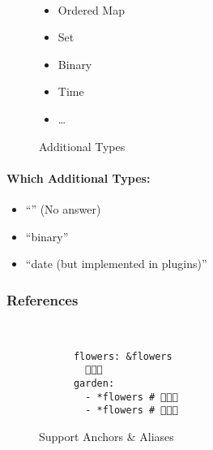 \begin{figure}[H]
  \begin{minipage}[t]{0.48\textwidth}
    \vspace{0pt}
    \begin{bchart}[max=9, width=0.85\textwidth]
    \end{bchart}
  \end{minipage}
  \begin{minipage}[t]{0pt}~\end{minipage}
  \begin{minipage}[t]{0.48\textwidth}
    \vspace{0pt}
    \begin{itemize}
      \item Ordered Map
      \item Set
      \item Binary
      \item Time
      \item …
    \end{itemize}
  \end{minipage}
  \caption{Additional Types}
\end{figure}

\paragraph{Which Additional Types:}
\begin{itemize}
  \item “” (No answer)
  \item “binary”
  \item “date (but implemented in plugins)”
\end{itemize}

\subsubsection{References}

\begin{figure}[H]
  \begin{minipage}[t]{0.48\textwidth}
    \vspace{0pt}
    \begin{bchart}[max=9, width=0.85\textwidth]
    \end{bchart}
  \end{minipage}
  \begin{minipage}[t]{0pt}~\end{minipage}
  \begin{minipage}[t]{0.48\textwidth}
    \vspace{0pt}
    \begin{verbatim}
      flowers: &flowers
        🌳🌸🌼
      garden:
        - *flowers # 🌳🌸🌼
        - *flowers # 🌳🌸🌼
    \end{verbatim}
  \end{minipage}
  \caption{Support Anchors \& Aliases}
\end{figure}

